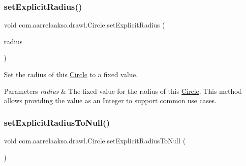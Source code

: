 \subsubsection{\texorpdfstring{set\+Explicit\+Radius()}{setExplicitRadius()}\hspace{0.1cm}{\footnotesize\ttfamily [2/2]}}
{\footnotesize\ttfamily void com.\+aarrelaakso.\+drawl.\+Circle.\+set\+Explicit\+Radius (\begin{DoxyParamCaption}\item[{@Not\+Null Integer}]{radius }\end{DoxyParamCaption})\hspace{0.3cm}{\ttfamily [protected]}}



Set the radius of this \hyperlink{classcom_1_1aarrelaakso_1_1drawl_1_1_circle}{Circle} to a fixed value. 


\begin{DoxyParams}{Parameters}
{\em radius} & The fixed value for the radius of this \hyperlink{classcom_1_1aarrelaakso_1_1drawl_1_1_circle}{Circle}. This method allows providing the value as an Integer to support common use cases. \\
\hline
\end{DoxyParams}
\mbox{\label{classcom_1_1aarrelaakso_1_1drawl_1_1_circle_aff1c4d184a3234f987a95b673f91bf18}} 
\subsubsection{\texorpdfstring{set\+Explicit\+Radius\+To\+Null()}{setExplicitRadiusToNull()}}
{\footnotesize\ttfamily void com.\+aarrelaakso.\+drawl.\+Circle.\+set\+Explicit\+Radius\+To\+Null (\begin{DoxyParamCaption}{ }\end{DoxyParamCaption})\hspace{0.3cm}{\ttfamily [private]}}

\mbox{\label{classcom_1_1aarrelaakso_1_1drawl_1_1_circle_a685203081a4d1f1065b714d215f2fcc2}} 
